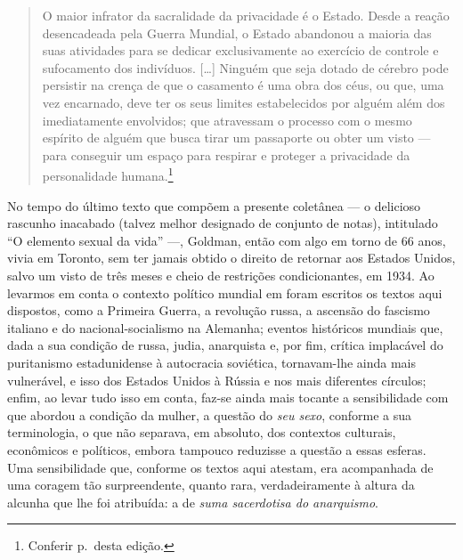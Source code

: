\begin{quote}
O maior infrator da sacralidade da privacidade é o Estado. Desde a
reação desencadeada pela Guerra Mundial, o Estado abandonou a maioria
das suas atividades para se dedicar exclusivamente ao exercício de
controle e sufocamento dos indivíduos. {[}\ldots{]} Ninguém que seja dotado
de cérebro pode persistir na crença de que o casamento é uma obra dos
céus, ou que, uma vez encarnado, deve ter os seus limites estabelecidos
por alguém além dos imediatamente envolvidos; que atravessam o processo
com o mesmo espírito de alguém que busca tirar um passaporte ou obter um
visto --- para conseguir um espaço para respirar e proteger a privacidade
da personalidade humana.\footnote{Conferir p.\,\pageref{ref3} desta edição.}
\end{quote}

No tempo do último texto que compõem a presente coletânea --- o delicioso
rascunho inacabado (talvez melhor designado de conjunto de notas),
intitulado ``O elemento sexual da vida'' ---, Goldman, então com algo em
torno de 66 anos, vivia em Toronto, sem ter jamais obtido o
direito de retornar aos Estados Unidos, salvo um visto de três meses e
cheio de restrições condicionantes, em 1934. Ao levarmos em conta o
contexto político mundial em foram escritos os textos aqui dispostos,
como a Primeira Guerra, a revolução russa, a ascensão do fascismo
italiano e do nacional-socialismo na Alemanha; eventos históricos
mundiais que, dada a sua condição de russa, judia, anarquista e, por
fim, crítica implacável do puritanismo estadunidense à autocracia
soviética, tornavam-lhe ainda mais vulnerável, e isso dos Estados Unidos
à Rússia e nos mais diferentes círculos; enfim, ao levar tudo isso em
conta, faz-se ainda mais tocante a sensibilidade com que abordou a
condição da mulher, a questão do \textit{seu sexo}, conforme a sua terminologia,
o que não separava, em absoluto, dos contextos culturais, econômicos e
políticos, embora tampouco reduzisse a questão a essas esferas. Uma
sensibilidade que, conforme os textos aqui atestam, era acompanhada de
uma coragem tão surpreendente, quanto rara, verdadeiramente à altura da
alcunha que lhe foi atribuída: a de \textit{suma sacerdotisa do anarquismo}.

